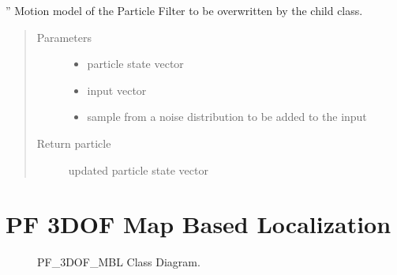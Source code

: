 \documentclass[letterpaper,10pt,english]{sphinxmanual}
\begin{document}
\begin{fulllineitems}
\begin{fulllineitems}
\end{fulllineitems}


\begin{fulllineitems}
\label{\detokenize{particle_filter:PF_3DOF_DR.PF_3DOF_DR.MotionModel}}
\sphinxAtStartPar
”
Motion model of the Particle Filter to be overwritten by the child class.
\begin{quote}\begin{description}
\item[{Parameters}] \leavevmode\begin{itemize}
\item {} 
\sphinxAtStartPar
{} \textendash{} particle state vector

\item {} 
\sphinxAtStartPar
{} \textendash{} input vector

\item {} 
\sphinxAtStartPar
{} \textendash{} sample from a noise distribution to be added to the input

\end{itemize}

\item[{Return particle}] \leavevmode
\sphinxAtStartPar
updated particle state vector

\end{description}\end{quote}

\end{fulllineitems}


\end{fulllineitems}



\section{PF 3DOF Map Based Localization}
\label{\detokenize{particle_filter:pf-3dof-map-based-localization}}
\begin{figure}[htbp]
\centering
\capstart

\noindent{}
\caption{PF\_3DOF\_MBL Class Diagram.}\label{\detokenize{particle_filter:id5}}\end{figure}
\end{document}
